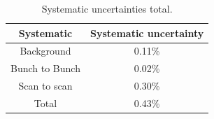 \begin{table} [H]
\begin{center}
\caption{Systematic uncertainties total.}
\begin{tabular}{|c c|} 
 \hline
 Systematic  & Systematic uncertainty \\ [0.5ex] 
 \hline\hline
 Background & 0.11\%   \\ 
 \hline
 Bunch to Bunch & 0.02\%  \\
 \hline
 Scan to scan & 0.30\% \\
 \hline
  Total          &     0.43\%  \\ [1.0ex]
 \hline
\end{tabular}
\end{center}
\end{table}

